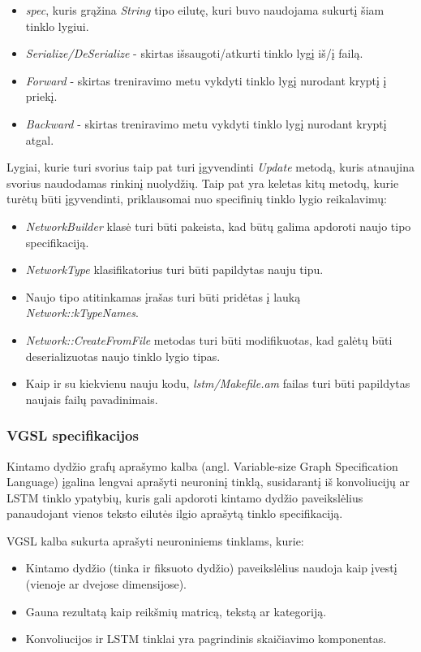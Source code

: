\documentclass{VUMIFInfBakalaurinis}
\begin{document}
\begin{itemize}
  \item \textit{spec}, kuris grąžina \textit{String} tipo eilutę, kuri buvo naudojama sukurtį šiam tinklo lygiui.
  \item \textit{Serialize/DeSerialize} - skirtas išsaugoti/atkurti tinklo lygį iš/į failą.
  \item \textit{Forward} - skirtas treniravimo metu vykdyti tinklo lygį nurodant kryptį į priekį.
  \item \textit{Backward} - skirtas treniravimo metu vykdyti tinklo lygį nurodant kryptį atgal.
\end{itemize}

Lygiai, kurie turi svorius taip pat turi įgyvendinti \textit{Update} metodą, kuris atnaujina svorius naudodamas rinkinį nuolydžių.
Taip pat yra keletas kitų metodų, kurie turėtų būti įgyvendinti, priklausomai nuo specifinių tinklo lygio reikalavimų:

\begin{itemize}
  \item \textit{NetworkBuilder} klasė turi būti pakeista, kad būtų galima apdoroti naujo tipo specifikaciją.
  \item \textit{NetworkType} klasifikatorius turi būti papildytas nauju tipu.
  \item Naujo tipo atitinkamas įrašas turi būti pridėtas į lauką \textit{Network::kTypeNames}.
  \item \textit{Network::CreateFromFile} metodas turi būti modifikuotas, kad galėtų būti deserializuotas naujo tinklo lygio tipas.
  \item Kaip ir su kiekvienu nauju kodu, \textit{lstm/Makefile.am} failas turi būti papildytas naujais failų pavadinimais. 
\end{itemize}

\subsubsection{VGSL specifikacijos}
Kintamo dydžio grafų aprašymo kalba (angl. Variable-size Graph Specification Language) įgalina lengvai aprašyti neuroninį tinklą, 
susidarantį iš konvoliucijų ar LSTM tinklo ypatybių, kuris gali apdoroti kintamo dydžio paveikslėlius panaudojant vienos teksto eilutės ilgio aprašytą tinklo specifikaciją.

VGSL kalba sukurta aprašyti neuroniniems tinklams, kurie:

\begin{itemize}
  \item Kintamo dydžio (tinka ir fiksuoto dydžio) paveikslėlius naudoja kaip įvestį (vienoje ar dvejose dimensijose).
  \item Gauna rezultatą kaip reikšmių matricą, tekstą ar kategoriją.
  \item Konvoliucijos ir LSTM tinklai yra pagrindinis skaičiavimo komponentas.
\end{itemize}
\end{document}
